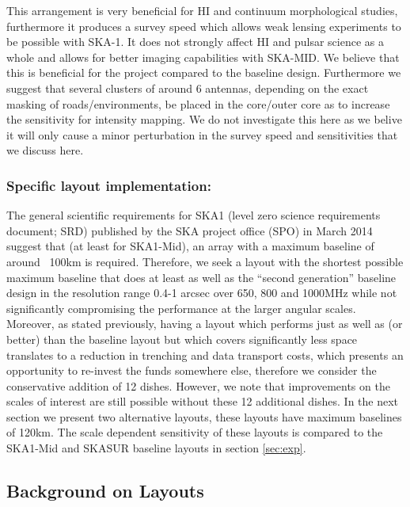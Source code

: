 \documentclass[sfheadings,a4paper,times,9pt,floats,floatfix]{article}
\begin{document}
This arrangement is very beneficial for HI and continuum morphological studies,
furthermore it produces a survey speed which allows weak lensing experiments to be
possible with SKA-1. It does not strongly affect HI and pulsar science as a whole and allows for
better imaging capabilities with SKA-MID. We believe that this is beneficial for the project
compared to the baseline design. Furthermore we suggest that several clusters of around 6
antennas, depending on the exact masking of roads/environments, be placed in the core/outer
core as to increase the sensitivity for intensity mapping. We do not
investigate this here as we belive it will only cause a minor perturbation in
the survey speed and sensitivities that we discuss here.

\subsubsection{Specific layout implementation:}
The general scientific requirements for SKA1\cite{srd} (level zero science requirements document; SRD) published by the
SKA project office (SPO) in March 2014 suggest that (at least for
SKA1-Mid), an array with a maximum baseline of around ~100km is required. Therefore, we seek a layout with the shortest possible
maximum baseline that does at least as well as the ``second generation'' baseline design in the resolution range 0.4-1 arcsec over
650, 800 and 1000MHz while not significantly compromising the performance at the larger angular scales. Moreover, as stated
previously, having a layout which performs just as well as (or better) than the baseline layout but which covers significantly
less space translates to a reduction in trenching and data transport costs, which presents an opportunity to re-invest the funds
somewhere else, therefore we consider the conservative addition of 12 dishes. However, we note that improvements on the scales of
interest are still possible without these 12 additional dishes. In the next section we present two alternative
layouts, these layouts have maximum baselines of 120km. The scale dependent sensitivity of these layouts is
compared to the SKA1-Mid and SKASUR baseline layouts in section \ref{sec:exp}.

\subsection{Background on Layouts}\label{sec:layouts}
\end{document}
